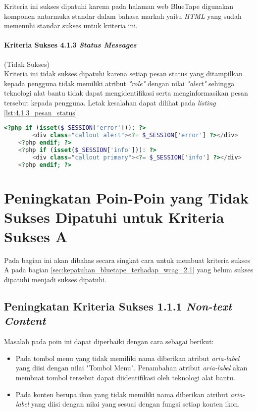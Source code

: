 Kriteria ini sukses dipatuhi karena pada halaman web BlueTape digunakan komponen antarmuka standar dalam bahasa markah yaitu \textit{HTML} yang sudah memenuhi standar sukses untuk kriteria ini.

\paragraph{Kriteria Sukses 4.1.3 \textit{Status Messages}}
\label{par:kepatuhan_bluetape_kriteria_sukses_4.1.3}
(Tidak Sukses)\\

Kriteria ini tidak sukses dipatuhi karena setiap pesan status yang ditampilkan kepada pengguna tidak memiliki atribut \textit{"role"} dengan nilai \textit{"alert"} sehingga teknologi alat bantu tidak dapat mengidentifikasi serta menginformasikan pesan tersebut kepada pengguna. Letak kesalahan dapat dilihat pada \textit{listing} \ref{lst:4.1.3_pesan_status}.

\begin{lstlisting}[frame=single, label={lst:4.1.3_pesan_status}, language=PHP, caption=Kriteria Sukses 4.1.3 - Atribut pada Pesan Status]
    <?php if (isset($_SESSION['error'])): ?>
        <div class="callout alert"><?= $_SESSION['error'] ?></div>
    <?php endif; ?>
    <?php if (isset($_SESSION['info'])): ?>
        <div class="callout primary"><?= $_SESSION['info'] ?></div>
    <?php endif; ?>
\end{lstlisting}

\section{Peningkatan Poin-Poin yang Tidak Sukses Dipatuhi untuk Kriteria Sukses A}
\label{sec:peningkatan_kriteria_sukses_a}
Pada bagian ini akan dibahas secara singkat cara untuk membuat kriteria sukses A pada bagian \ref{sec:kepatuhan_bluetape_terhadap_wcag_2.1} yang belum sukses dipatuhi menjadi sukses dipatuhi.

\subsection{Peningkatan Kriteria Sukses 1.1.1 \textit{Non-text Content}}
\label{subsec:peningkatan_kriteria_sukses_1.1.1}
Masalah pada poin ini dapat diperbaiki dengan cara sebagai berikut: 

\begin{itemize}
    \item Pada tombol menu yang tidak memiliki nama diberikan atribut \textit{aria-label} yang diisi dengan nilai "Tombol Menu". Penambahan atribut \textit{aria-label} akan membuat tombol tersebut dapat diidentifikasi oleh teknologi alat bantu.
    \item Pada konten berupa ikon yang tidak memiliki nama diberikan atribut \textit{aria-label} yang diisi dengan nilai yang sesuai dengan fungsi setiap konten ikon.
\end{itemize}

